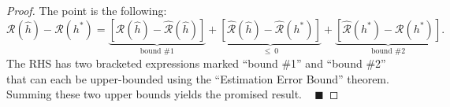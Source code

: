 \begin{proof}
    The point is the following:
    \[ \mathcal{R}(\hat{h}) - \mathcal{R}(h^*)
    = \underbrace{\left[
        \mathcal{R}(\hat{h}) - \hat{\mathcal{R}}(\hat{h})
    \right]}_{\text{bound \#1}}
    + \underbrace{\left[
        \hat{\mathcal{R}}(\hat{h}) - \hat{\mathcal{R}}(h^*)
    \right]}_{\leq \ 0}
    + \underbrace{\left[
        \hat{\mathcal{R}}(h^*) - \mathcal{R}(h^*)
    \right]}_{\text{bound \#2}}. \]
    The RHS has two bracketed expressions marked
    ``bound \#1'' and ``bound \#2''
    that can each be upper-bounded using the
    ``Estimation Error Bound'' theorem.
    Summing these two upper bounds
    yields the promised result. ~ $\blacksquare$
\end{proof}

